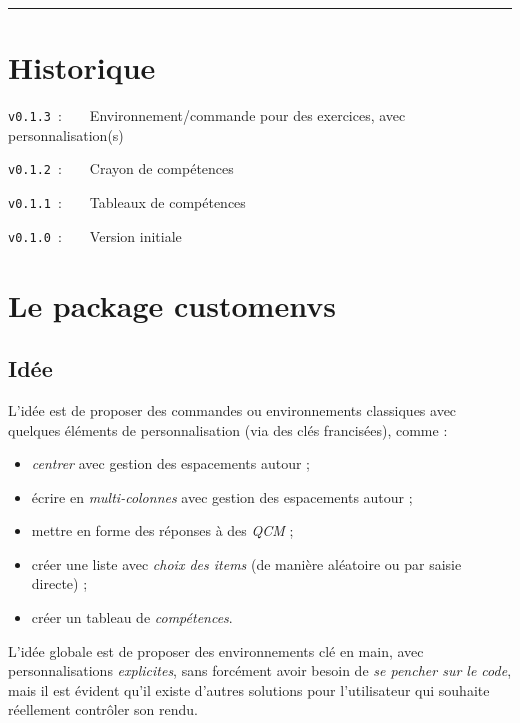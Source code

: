 \documentclass[french,11pt,a4paper]{article}
\begin{document}
\tableofcontents

\vspace*{5mm}

\hrule

\pagebreak

\section{Historique}

\verb|v0.1.3|~:~~~~Environnement/commande pour des exercices, avec personnalisation(s)

\verb|v0.1.2|~:~~~~Crayon de compétences

\verb|v0.1.1|~:~~~~Tableaux de compétences

\verb|v0.1.0|~:~~~~Version initiale

\pagebreak

\section{Le package customenvs}

\subsection{Idée}

L'idée est de proposer des commandes ou environnements classiques avec quelques éléments de personnalisation (via des \textsf{clés} francisées), comme :

\begin{itemize}
	\item \textit{centrer} avec gestion des espacements autour ;
	\item écrire en \textit{multi-colonnes} avec gestion des espacements autour ;
	\item mettre en forme des réponses à des \textit{QCM} ;
	\item créer une liste avec \textit{choix des items} (de manière aléatoire ou par saisie directe) ;
	\item créer un tableau de \textit{compétences}.
\end{itemize}

\smallskip

L'idée globale est de proposer des environnements clé en main, avec personnalisations \textit{explicites}, sans forcément avoir besoin de \textit{se pencher sur le code}, mais il est évident qu'il existe d'autres solutions pour l'utilisateur qui souhaite réellement contrôler son rendu.
\end{document}
